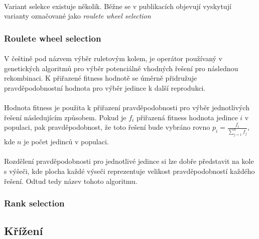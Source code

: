 \documentclass[bc,male,java,dept460]{diploma}		%
\begin{document}
\paragraph*{}
Variant selekce existuje několik. Běžne se v publikacích objevují vyskytují varianty označované jako \textit{roulete wheel selection}

\subsubsection*{Roulete wheel selection}
\paragraph*{}
V češtině pod názvem výběr ruletovým kolem, je operátor používaný v genetických algoritmů pro výběr potenciálně vhodných řešení pro následnou rekombinaci. K přiřazené fitness hodnotě se úměrně přidružuje pravděpodobnostní hodnota pro výběr jedince k další reprodukci. 

\paragraph*{}
Hodnota fitness je použita k přiřazení pravděpodobnosti pro výběr jednotlivých řešení následujícím způsobem. Pokud je $f_i$ přiřazená fitness hodnota jedince $i$ v populaci, pak pravděpodobnost, že toto řešení bude vybráno rovno $p_i=\frac{f_i}{\sum\limits_{j=1}^n f_j}$, kde $n$ je počet jedinců v populaci.

\paragraph*{}
Rozdělení pravděpodobnosti pro jednotlivé jedince si lze dobře představit na kole s výšeči, kde plocha každé výseči reprezentuje velikost pravděpodobností každého řešení. Odtud tedy název tohoto algoritmu.


\subsubsection*{Rank selection}



\subsection{Křížení}
\end{document}
